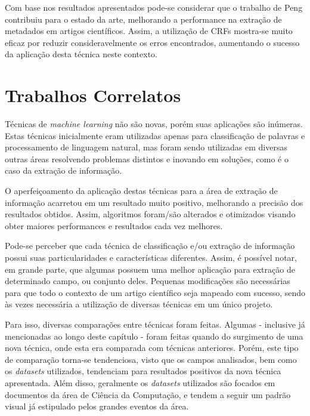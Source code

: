Com base nos resultados apresentados pode-se considerar que o trabalho de Peng \cite{Peng-CRF-IE} contribuiu para o estado da arte, melhorando a performance na extração de metadados em artigos científicos. Assim, a utilização de CRFs mostra-se muito eficaz por reduzir consideravelmente os erros encontrados, aumentando o sucesso da aplicação desta técnica neste contexto.

\section{Trabalhos Correlatos}
\label{sec:revision}


Técnicas de \emph{machine learning} não são novas, porém suas aplicações são inúmeras. Estas técnicas inicialmente eram utilizadas apenas para classificação de palavras e processamento de linguagem natural, mas foram sendo utilizadas em diversas outras áreas resolvendo problemas distintos e inovando em soluções, como é o caso da extração de informação.

O aperfeiçoamento da aplicação destas técnicas para a área de extração de informação acarretou em um resultado muito positivo, melhorando a precisão dos resultados obtidos. Assim, algoritmos foram/são alterados e otimizados visando obter maiores performances e resultados cada vez melhores.

Pode-se perceber que cada técnica de classificação e/ou extração de informação possui suas particularidades e características diferentes. Assim, é possível notar, em grande parte, que algumas possuem uma melhor aplicação para extração de determinado campo, ou conjunto deles. Pequenas modificações são necessárias para que todo o contexto de um artigo científico seja mapeado com sucesso, sendo às vezes necessária a utilização de diversas técnicas em um único projeto.

Para isso, diversas comparações entre técnicas foram feitas. Algumas - inclusive já mencionadas ao longo deste capítulo - foram feitas quando do surgimento de uma nova técnica, onde esta era comparada com técnicas anteriores. Porém, este tipo de comparação torna-se tendenciosa, visto que os campos analisados, bem como os \emph{datasets} utilizados, tendenciam para resultados positivos da nova técnica apresentada. Além disso, geralmente os \emph{datasets} utilizados são focados em documentos da área de Ciência da Computação, e tendem a seguir um padrão visual já estipulado pelos grandes eventos da área.

